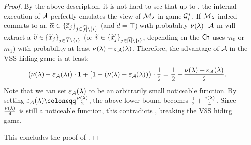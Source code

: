 \begin{proof}
By the above description, it is not hard to see that up to , the internal execution of $\mathcal{A}$ perfectly emulates the view of $\mathcal{M}_\lambda$ in game $\mathcal{G}^*_i$. If $\mathcal{M}_\lambda$ indeed commits to an $\widetilde{\alpha} \in \{\widetilde{x}_j\}_{j \in [\widetilde{t}] \setminus \{i\}}$ (and $\tilde{d} = \top$) with probability $\nu(\lambda)$, $\mathcal{A}$ in  will extract a $\widetilde{v} \in \{\widetilde{x}_j\}_{j \in [\widetilde{t}] \setminus \{i\}}$ (or $\widetilde{v} \in \{\widetilde{x}'_j\}_{j \in [\widetilde{t}] \setminus \{i\}}$, depending on the $\mathsf{Ch}$ uses $m_0$ or $m_1$) with probability at least $\nu(\lambda) - \varepsilon_\mathcal{A}(\lambda)$. Therefore, the advantage of $\mathcal{A}$ in the VSS hiding game is at least:
$$\big(\nu(\lambda) - \varepsilon_\mathcal{A}(\lambda)\big) \cdot 1 + \big(1 - (\nu(\lambda) - \varepsilon_\mathcal{A}(\lambda)) \big)\cdot \frac{1}{2} = \frac{1}{2} + \frac{\nu(\lambda) - \varepsilon_\mathcal{A}(\lambda)}{2}.$$
Note that we can set $\varepsilon_\mathcal{A}(\lambda)$ to be an arbitrarily small noticeable function. By setting $\epsilon_\Adv(\secpar) \coloneqq \frac{\nu(\secpar)}{2}$, the above lower bound becomes $\frac{1}{2} + \frac{\nu(\lambda)}{4}$. Since $\frac{\nu(\lambda)}{4}$ is still a noticeable function, this contradicts , breaking the VSS hiding game.






This concludes the proof of .

\end{proof}

